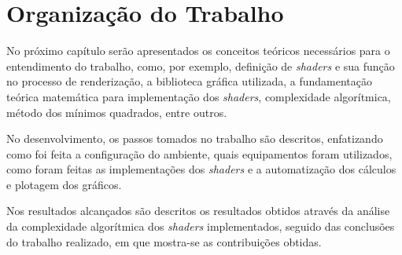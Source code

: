 \section{Organização do Trabalho}

	No próximo capítulo serão apresentados os conceitos teóricos necessários para o entendimento do trabalho, como, por exemplo, definição de \textit{shaders} e sua função no processo de renderização, a biblioteca gráfica utilizada,  a fundamentação teórica matemática para implementação dos \textit{shaders}, complexidade algorítmica, método dos mínimos quadrados, entre outros. 

	No desenvolvimento, os passos tomados no trabalho são descritos, enfatizando como foi feita a configuração do ambiente, quais equipamentos foram utilizados, como foram feitas as implementações dos \textit{shaders} e a automatização dos cálculos e plotagem dos gráficos.

	Nos resultados alcançados são descritos os resultados obtidos através da análise da complexidade algorítmica dos \textit{shaders} implementados, seguido das conclusões do trabalho realizado, em que mostra-se as contribuições obtidas.   